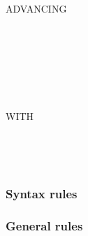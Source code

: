 \begin{syntax}
  \begin{1=}
    \recordname
    \begin{0-1}
      \begin{1=}
        \identifier \\
        \literal \\
        \functionname
      \end{1=}
    \end{0-1} \\

     \filename {}
    \begin{1=}
      \identifier \\
      \literal \\
      \functionname
    \end{1=}
  \end{1=}

  \begin{0-1}
    \begin{1=}
       \\
    \end{1=}
    ADVANCING
    \begin{1=}
      \begin{1=}
        \identifier \\
        \literal
      \end{1=}
      \begin{0-1}
         \\
      \end{0-1} \\

      \mnemonicname \\

    \end{1=}
  \end{0-1}

  \begin{0-1}
  \end{0-1}
  \begin{0-1}
    WITH
    \begin{0-1}
    \end{0-1}
  \end{0-1}

  \begin{0+}
      \imperativestatement \\
       \imperativestatement
  \end{0+} \\

  \begin{0-1}
  \end{0-1}
\end{syntax}

\subsubsection{Syntax rules}

\subsubsection{General rules}


